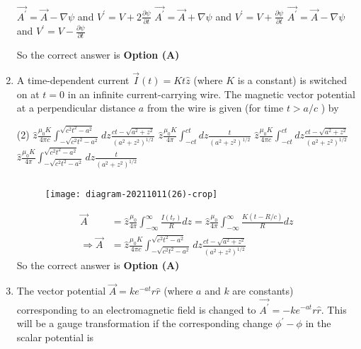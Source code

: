 \begin{enumerate}
\begin{tasks}
		\task[\textbf{B.}] $\overrightarrow{A^{\prime}}=\vec{A}-\nabla \psi$ and $V^{\prime}=V+2 \frac{\partial \psi}{\partial t}$
		\task[\textbf{C.}] $\overrightarrow{A^{\prime}}=\vec{A}+\nabla \psi$ and $V^{\prime}=V+\frac{\partial \psi}{\partial t}$
		\task[\textbf{D.}] $\overrightarrow{A^{\prime}}=\vec{A}-\nabla \psi$ and $V^{\prime}=V-\frac{\partial \psi}{\partial t}$
	\end{tasks}
\begin{answer}
	So the correct answer is \textbf{Option (A)}
\end{answer}
	\item
	 A time-dependent current $\vec{I}(t)=K t \hat{z}$ (where $K$ is a constant) is switched on at $t=0$ in an infinite current-carrying wire. The magnetic vector potential at a perpendicular distance $a$ from the wire is given (for time $t>a / c$ ) by
	{	}
	\begin{tasks}(2)
		\task[\textbf{A.}]  $\hat{z} \frac{\mu_{0} K}{4 \pi c} \int_{-\sqrt{c^{2} t^{2}-a^{2}}}^{\sqrt{c^{2} t^{2}-a^{2}}} d z \frac{c t-\sqrt{a^{2}+z^{2}}}{\left(a^{2}+z^{2}\right)^{1 / 2}}$
		\task[\textbf{B.}]  $\hat{z} \frac{\mu_{0} K}{4 \pi} \int_{-c t}^{c t} d z \frac{t}{\left(a^{2}+z^{2}\right)^{1 / 2}}$
		\task[\textbf{C.}] $\hat{z} \frac{\mu_{0} K}{4 \pi c} \int_{-c t}^{c t} d z \frac{c t-\sqrt{a^{2}+z^{2}}}{\left(a^{2}+z^{2}\right)^{1 / 2}}$
		\task[\textbf{D.}] $\hat{z} \frac{\mu_{0} K}{4 \pi} \int_{-\sqrt{c^{2} t^{2}-a^{2}}}^{\sqrt{c^{2} t^{2}-a^{2}}} d z \frac{t}{\left(a^{2}+z^{2}\right)^{1 / 2}}$
	\end{tasks}
	\begin{answer}$\left. \right. $
		\begin{figure}[H]
			\centering
			\texttt{[image: diagram-20211011(26)-crop]}
		\end{figure}
		\begin{align*}
		\vec{A}&=\hat{z} \frac{\mu_{0}}{4 \pi} \int_{-\infty}^{\infty} \frac{I\left(t_{r}\right)}{R} d z=\hat{z} \frac{\mu_{0}}{4 \pi} \int_{-\infty}^{\infty} \frac{K(t-R / c)}{R} d z\\
		\Rightarrow \vec{A}&=\hat{z} \frac{\mu_{0} K}{4 \pi c} \int_{-\sqrt{c^{2} t^{2}-a^{2}}}^{\sqrt{c^{2} t^{2}-a^{2}}} d z \frac{c t-\sqrt{a^{2}+z^{2}}}{\left(a^{2}+z^{2}\right)^{1 / 2}}
		\end{align*}
		So the correct answer is \textbf{Option (A)}
	\end{answer}
	\item  The vector potential $\vec{A}=k e^{-a t} r \hat{r}$ (where $a$ and $k$ are constants) corresponding to an electromagnetic field is changed to $\overrightarrow{A^{\prime}}=-k e^{-a t} r \hat{r}$. This will be a gauge transformation if the corresponding change $\phi^{\prime}-\phi$ in the scalar potential is

\end{enumerate}
